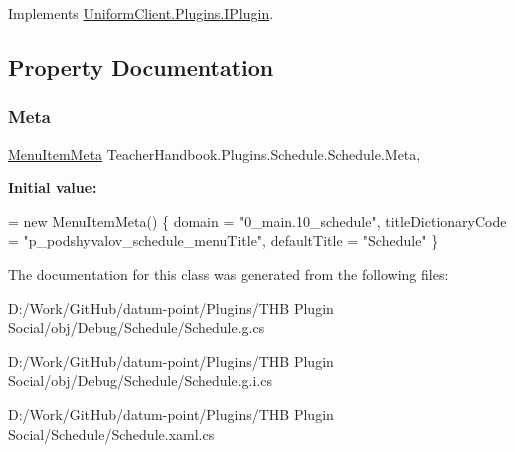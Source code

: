Implements \mbox{\hyperlink{interface_uniform_client_1_1_plugins_1_1_i_plugin_a1ca2220c7ce4a23f8f41af10efccf328}{Uniform\+Client.\+Plugins.\+I\+Plugin}}.



\subsection{Property Documentation}
\mbox{\label{class_teacher_handbook_1_1_plugins_1_1_schedule_1_1_schedule_a42435b27bd43eb1afbf5a504bbae08b6}} 
\subsubsection{\texorpdfstring{Meta}{Meta}}
{\footnotesize\ttfamily \mbox{\hyperlink{class_uniform_client_1_1_plugins_1_1_menu_item_meta}{Menu\+Item\+Meta}} Teacher\+Handbook.\+Plugins.\+Schedule.\+Schedule.\+Meta\hspace{0.3cm}{\ttfamily [get]}, {\ttfamily [set]}}

{\bfseries Initial value\+:}
\begin{DoxyCode}
= \textcolor{keyword}{new} MenuItemMeta() \{
            domain = \textcolor{stringliteral}{"0\_main.10\_schedule"},
            titleDictionaryCode = \textcolor{stringliteral}{"p\_podshyvalov\_schedule\_menuTitle"},
            defaultTitle = \textcolor{stringliteral}{"Schedule"} \}
\end{DoxyCode}


The documentation for this class was generated from the following files\+:\begin{DoxyCompactItemize}
\item 
D\+:/\+Work/\+Git\+Hub/datum-\/point/\+Plugins/\+T\+H\+B Plugin Social/obj/\+Debug/\+Schedule/Schedule.\+g.\+cs\item 
D\+:/\+Work/\+Git\+Hub/datum-\/point/\+Plugins/\+T\+H\+B Plugin Social/obj/\+Debug/\+Schedule/Schedule.\+g.\+i.\+cs\item 
D\+:/\+Work/\+Git\+Hub/datum-\/point/\+Plugins/\+T\+H\+B Plugin Social/\+Schedule/Schedule.\+xaml.\+cs\end{DoxyCompactItemize}
